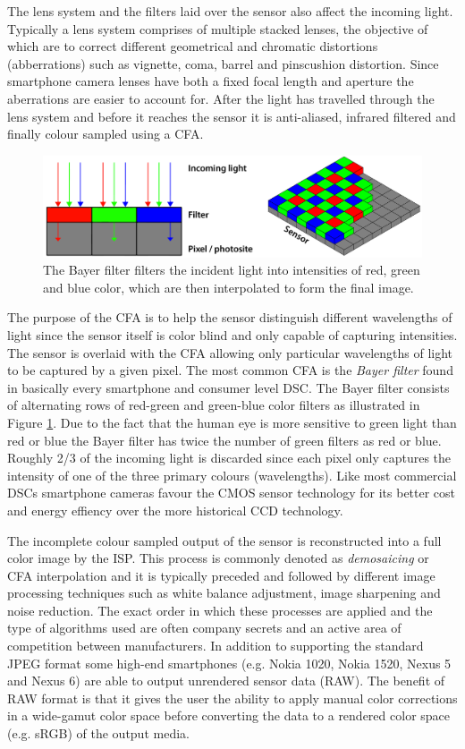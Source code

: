 \documentclass[thesis.tex]{subfiles}
\begin{document}
The lens system and the filters laid over the sensor also affect the incoming light. Typically a lens system comprises of multiple stacked lenses, the objective of which are to correct different geometrical and chromatic distortions (abberrations) such as vignette, coma, barrel and pinscushion distortion. Since smartphone camera lenses have both a fixed focal length and aperture the aberrations are easier to account for. After the light has travelled through the lens system and before it reaches the sensor it is anti-aliased, infrared filtered and finally colour sampled using a CFA. \cite{color_pipeline}

\begin{figure}[ht]
\centering \includegraphics[width=\textwidth]{images/bayer}
\caption{The Bayer filter filters the incident light into intensities of red, green and blue color, which are then interpolated to form the final image. \label{figure:bayer}}
\end{figure}

The purpose of the CFA is to help the sensor distinguish different wavelengths of light since the sensor itself is color blind and only capable of capturing intensities. The sensor is overlaid with the CFA allowing only particular wavelengths of light to be captured by a given pixel. The most common CFA is the \textit{Bayer filter} found in basically every smartphone and consumer level DSC. The Bayer filter consists of alternating rows of red-green and green-blue color filters as illustrated in Figure \ref{figure:bayer}. Due to the fact that the human eye is more sensitive to green light than red or blue the Bayer filter has twice the number of green filters as red or blue. Roughly 2/3 of the incoming light is discarded since each pixel only captures the intensity of one of the three primary colours (wavelengths). Like most commercial DSCs smartphone cameras favour the CMOS sensor technology for its better cost and energy effiency over the more historical CCD technology.

The incomplete colour sampled output of the sensor is reconstructed into a full color image by the ISP. This process is commonly denoted as \textit{demosaicing} or CFA interpolation and it is typically preceded and followed by different image processing techniques such as white balance adjustment, image sharpening and noise reduction. The exact order in which these processes are applied and the type of algorithms used are often company secrets and an active area of competition between manufacturers. In addition to supporting the standard JPEG format some high-end smartphones (e.g. Nokia 1020, Nokia 1520, Nexus 5 and Nexus 6) are able to output unrendered sensor data (RAW). The benefit of RAW format is that it gives the user the ability to apply manual color corrections in a wide-gamut color space before converting the data to a rendered color space (e.g. sRGB) of the output media.
\end{document}
